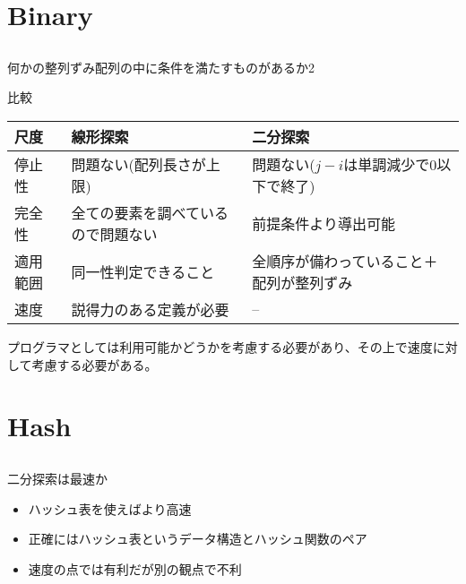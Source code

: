 \documentclass{beamer}
\begin{document}
\section{Binary}		%
\subsection{}

\begin{frame}[fragile]{何かの整列ずみ配列の中に条件を満たすものがあるか}{2}
\end{frame}

\begin{frame}[fragile]{比較}{}

\begin{tabular}[h]{|l|p{}|p{}|}
尺度 & 線形探索 & 二分探索 \\\hline
停止性 & 問題ない(配列長さが上限) & 問題ない($j - i$は単調減少で0以下で終了) \\
完全性 & 全ての要素を調べているので問題ない & 前提条件より導出可能 \\
適用範囲 & 同一性判定できること & 全順序が備わっていること＋配列が整列ずみ \\
速度 & 説得力のある定義が必要 & -- \\
\end{tabular}
\vfill
プログラマとしては利用可能かどうかを考慮する必要があり、その上で速度に対して考慮する必要がある。
\end{frame}

\section{Hash}		%
\subsection{}

\begin{frame}[fragile]{二分探索は最速か}{}
\begin{itemize}\itemsep20pt%
\item ハッシュ表を使えばより高速
\item 正確にはハッシュ表というデータ構造{\footnotemark}とハッシュ関数のペア
\item 速度の点では有利だが別の観点で不利
\end{itemize}
\vfill
{}
\end{frame}
\end{document}
